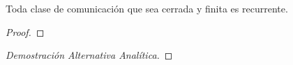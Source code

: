 \begin{teo}
    Toda clase de comunicación que sea cerrada y finita es recurrente.

\begin{proof}


\end{proof}
\begin{proof}[Demostración Alternativa Analítica]

\end{proof}


\end{teo}
